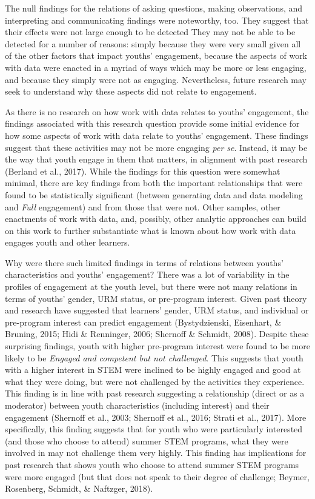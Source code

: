 \documentclass[]{book}
\theoremstyle{definition}
\theoremstyle{definition}
\theoremstyle{definition}
\theoremstyle{remark}
\begin{document}
The null findings for the relations of asking questions, making
observations, and interpreting and communicating findings were
noteworthy, too. They suggest that their effects were not large enough
to be detected They may not be able to be detected for a number of
reasons: simply because they were very small given all of the other
factors that impact youths' engagement, because the aspects of work with
data were enacted in a myriad of ways which may be more or less
engaging, and because they simply were not as engaging. Nevertheless,
future research may seek to understand why these aspects did not relate
to engagement.

As there is no research on how work with data relates to youths'
engagement, the findings associated with this research question provide
some initial evidence for how some aspects of work with data relate to
youths' engagement. These findings suggest that these activities may not
be more engaging \emph{per se}. Instead, it may be the way that youth
engage in them that matters, in alignment with past research (Berland et
al., 2017). While the findings for this question were somewhat minimal,
there are key findings from both the important relationships that were
found to be statistically significant (between generating data and data
modeling and \emph{Full} engagement) and from those that were not. Other
samples, other enactments of work with data, and, possibly, other
analytic approaches can build on this work to further substantiate what
is known about how work with data engages youth and other learners.

Why were there such limited findings in terms of relations between
youths' characteristics and youths' engagement? There was a lot of
variability in the profiles of engagement at the youth level, but there
were not many relations in terms of youths' gender, URM status, or
pre-program interest. Given past theory and research have suggested that
learners' gender, URM status, and individual or pre-program interest can
predict engagement (Bystydzienski, Eisenhart, \& Bruning, 2015; Hidi \&
Renninger, 2006; Shernoff \& Schmidt, 2008). Despite these surprising
findings, youth with higher pre-program interest were found to be more
likely to be \emph{Engaged and competent but not challenged}. This
suggests that youth with a higher interest in STEM were inclined to be
highly engaged and good at what they were doing, but were not challenged
by the activities they experience. This finding is in line with past
research suggesting a relationship (direct or as a moderator) between
youth characteristics (including interest) and their engagement
(Shernoff et al., 2003; Shernoff et al., 2016; Strati et al., 2017).
More specifically, this finding suggests that for youth who were
particularly interested (and those who choose to attend) summer STEM
programs, what they were involved in may not challenge them very highly.
This finding has implications for past research that shows youth who
choose to attend summer STEM programs were more engaged (but that does
not speak to their degree of challenge; Beymer, Rosenberg, Schmidt, \&
Naftzger, 2018).
\end{document}
